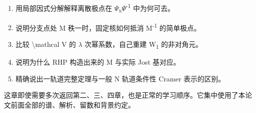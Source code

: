 \begin{enumerate}[leftmargin=2em]
\item 用局部因式分解解释离散极点在 \ensuremath{\Psi}\textsubscript{x}\ensuremath{\Psi}\textsuperscript{-}\textsuperscript{1} 中为何可去。
\item 说明分支点处 M 秩一时，固定核如何抵消 M\textsuperscript{-}\textsuperscript{1} 的简单极点。
\item 比较 \textbackslash{}mathcal V 的 \ensuremath{\lambda} 次幂系数，自己重建 W\textsubscript{1} 的非对角元。
\item 说明为什么 RHP 构造出来的 M 与实际 Jost 基对应。
\item 精确说出一轨道完整定理与一般 N 轨道条件性 Cramer 表示的区别。
\end{enumerate}

这章即使需要多次返回第二、三、四章，也是正常的学习顺序。它集中使用了本论文前面全部的谱、解析、留数和背景约定。\par

